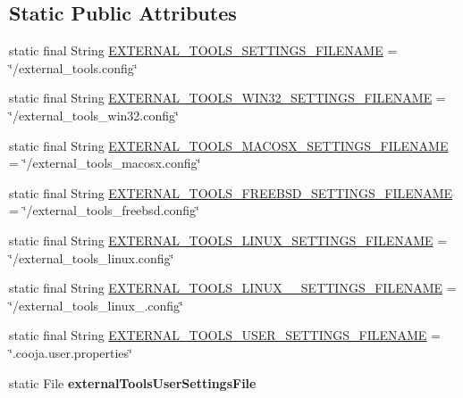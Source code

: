 \subsection*{Static Public Attributes}
\begin{DoxyCompactItemize}
\item 
static final String \hyperlink{classorg_1_1contikios_1_1cooja_1_1Cooja_ac8b53710bce8753270fcd8826ea539f9}{E\-X\-T\-E\-R\-N\-A\-L\-\_\-\-T\-O\-O\-L\-S\-\_\-\-S\-E\-T\-T\-I\-N\-G\-S\-\_\-\-F\-I\-L\-E\-N\-A\-M\-E} = \char`\"{}/external\-\_\-tools.\-config\char`\"{}
\item 
static final String \hyperlink{classorg_1_1contikios_1_1cooja_1_1Cooja_ac0b18524e403561cba19ab3276959e52}{E\-X\-T\-E\-R\-N\-A\-L\-\_\-\-T\-O\-O\-L\-S\-\_\-\-W\-I\-N32\-\_\-\-S\-E\-T\-T\-I\-N\-G\-S\-\_\-\-F\-I\-L\-E\-N\-A\-M\-E} = \char`\"{}/external\-\_\-tools\-\_\-win32.\-config\char`\"{}
\item 
static final String \hyperlink{classorg_1_1contikios_1_1cooja_1_1Cooja_a72a3d8502271a9fa5834c6ba5181d4a4}{E\-X\-T\-E\-R\-N\-A\-L\-\_\-\-T\-O\-O\-L\-S\-\_\-\-M\-A\-C\-O\-S\-X\-\_\-\-S\-E\-T\-T\-I\-N\-G\-S\-\_\-\-F\-I\-L\-E\-N\-A\-M\-E} = \char`\"{}/external\-\_\-tools\-\_\-macosx.\-config\char`\"{}
\item 
static final String \hyperlink{classorg_1_1contikios_1_1cooja_1_1Cooja_af201e3cdd7ce3ced1eb35725d30e1878}{E\-X\-T\-E\-R\-N\-A\-L\-\_\-\-T\-O\-O\-L\-S\-\_\-\-F\-R\-E\-E\-B\-S\-D\-\_\-\-S\-E\-T\-T\-I\-N\-G\-S\-\_\-\-F\-I\-L\-E\-N\-A\-M\-E} = \char`\"{}/external\-\_\-tools\-\_\-freebsd.\-config\char`\"{}
\item 
static final String \hyperlink{classorg_1_1contikios_1_1cooja_1_1Cooja_aed94a271d3a2f2fedf0f285aa065ed2c}{E\-X\-T\-E\-R\-N\-A\-L\-\_\-\-T\-O\-O\-L\-S\-\_\-\-L\-I\-N\-U\-X\-\_\-\-S\-E\-T\-T\-I\-N\-G\-S\-\_\-\-F\-I\-L\-E\-N\-A\-M\-E} = \char`\"{}/external\-\_\-tools\-\_\-linux.\-config\char`\"{}
\item 
static final String \hyperlink{classorg_1_1contikios_1_1cooja_1_1Cooja_a94c686a8440aea855f590d3cce89ad41}{E\-X\-T\-E\-R\-N\-A\-L\-\_\-\-T\-O\-O\-L\-S\-\_\-\-L\-I\-N\-U\-X\-\_\-\_\-\-S\-E\-T\-T\-I\-N\-G\-S\-\_\-\-F\-I\-L\-E\-N\-A\-M\-E} = \char`\"{}/external\-\_\-tools\-\_\-linux\-\_.\-config\char`\"{}
\item 
static final String \hyperlink{classorg_1_1contikios_1_1cooja_1_1Cooja_a3bdb7946630922d2dbbd00093113065d}{E\-X\-T\-E\-R\-N\-A\-L\-\_\-\-T\-O\-O\-L\-S\-\_\-\-U\-S\-E\-R\-\_\-\-S\-E\-T\-T\-I\-N\-G\-S\-\_\-\-F\-I\-L\-E\-N\-A\-M\-E} = \char`\"{}.cooja.\-user.\-properties\char`\"{}
\item 
\hypertarget{classorg_1_1contikios_1_1cooja_1_1Cooja_aaba23c0b94b4019d523762425fe83b76}{static File {\bfseries external\-Tools\-User\-Settings\-File}}\label{classorg_1_1contikios_1_1cooja_1_1Cooja_aaba23c0b94b4019d523762425fe83b76}


\end{DoxyCompactItemize}

